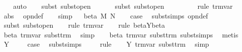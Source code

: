 \begin{isabellebody}
\ \ \isamarkupfalse%
\ auto{\isacharbrackleft}{}{\isacharbrackright}\isanewline
\ \ \isamarkupfalse%
\ {\isacharparenleft}subst\ subst{\isacharunderscore}open{}{\isacharparenright}\isanewline
\ \ \isamarkupfalse%
\isanewline
\ \ \isamarkupfalse%
\ {\isacharparenleft}subst\ subst{\isacharunderscore}open{}{\isacharparenright}\isanewline
\ \ \isamarkupfalse%
\isanewline
\ \ \isamarkupfalse%
\isanewline
\ \ \isamarkupfalse%
\ {\isacharparenleft}rule\ trm{\isachardot}var{\isacharparenright}\isanewline
\ \ \isamarkupfalse%
\ abs\ \isamarkupfalse%
\ opn{\isacharprime}{\isacharunderscore}def\isanewline
\ \ \isamarkupfalse%
\ simp\isanewline
\ \isamarkupfalse%
\isanewline
{}\isamarkupfalse%
\ {\isacharparenleft}beta\ M\ N{\isacharparenright}\isanewline
\ \ \isamarkupfalse%
\ {\isacharquery}case\ \isamarkupfalse%
\ subst{\isachardot}simps\ opn{\isacharprime}{\isacharunderscore}def\isanewline
\ \ \isamarkupfalse%
\ {\isacharparenleft}subst\ subst{\isacharunderscore}open{\isacharparenright}\isanewline
\ \ \isamarkupfalse%
\ {\isacharparenleft}rule\ trm{\isachardot}var{\isacharparenright}\isanewline
\ \ \isamarkupfalse%
\ {\isacharparenleft}rule\ beta{\isacharunderscore}Y{\isacharunderscore}beta{\isacharprime}{\isacharparenright}\isanewline
\ \ \isamarkupfalse%
\isanewline
\ \ \isamarkupfalse%
\ beta\ trm{\isachardot}var\ subst{\isacharunderscore}trm\ \isamarkupfalse%
\ simp\isanewline
\ \ \isamarkupfalse%
\ beta{\isacharparenleft}{}{\isacharparenright}\ trm{\isachardot}var\ subst{\isacharunderscore}trm\ subst{\isachardot}simps{\isacharparenleft}{}{\isacharparenright}\ \isamarkupfalse%
\ metis\isanewline
{}\isamarkupfalse%
\isanewline
{}\isamarkupfalse%
\ Y\ \isanewline
\ \ \isamarkupfalse%
\ {\isacharquery}case\ \isamarkupfalse%
\ subst{\isachardot}simps\ \isanewline
\ \ \isamarkupfalse%
\ rule\isanewline
\ \ \isamarkupfalse%
\ Y\ trm{\isachardot}var\ subst{\isacharunderscore}trm\ \isamarkupfalse%
\ simp\isanewline
{}\isamarkupfalse%
%
\endisatagproof
{\isafoldproof}%
%
\isadelimproof
\isanewline

\end{isabellebody}
